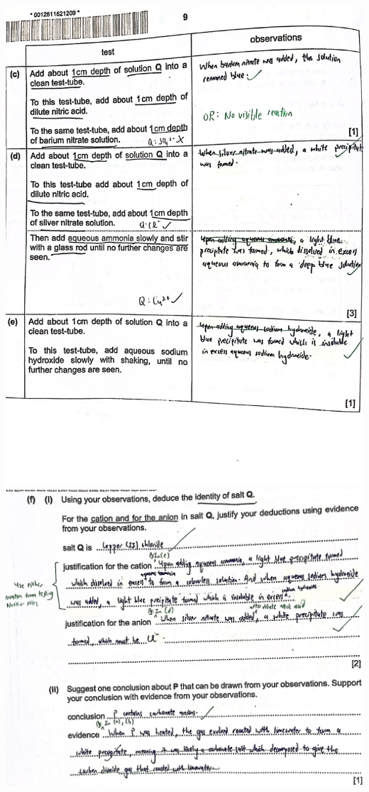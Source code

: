 \documentclass[oneside]{book}
\begin{document}
\begin{center}
        \includegraphics[width=\textwidth,height=\textheight,keepaspectratio]{images/B3CA916E-FF2B-4CE2-8230-C665B4472A20.jpeg}\\
        \includegraphics[width=\textwidth,height=\textheight,keepaspectratio]{images/F1A32D54-8CB3-4C0A-8D4A-AD0ACD8A5EBE.jpeg}\\

\end{center}
\end{document}
